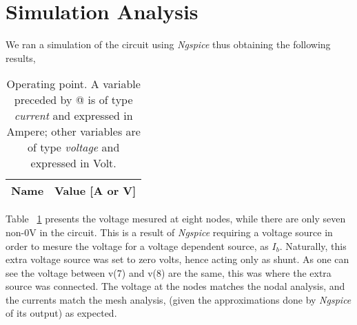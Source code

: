 \section{Simulation Analysis}

\label{sec:simulation}
We ran a simulation of the circuit using {\it Ngspice} thus obtaining the following results, 

\begin{table}[h]
\scriptsize
  \centering
  \begin{tabular}{|l|r|}
    \hline    
    {\bf Name} & {\bf Value [A or V]} \\ \hline
    
  \end{tabular}
  \caption{\scriptsize Operating point. A variable preceded by @ is of type {\em current}
    and expressed in Ampere; other variables are of type {\it voltage} and expressed in
    Volt.}
  \label{tab:op}
\end{table}
Table ~\ref{tab:op} presents the voltage mesured at eight nodes, while there are only seven non-0V in the circuit. This is a result of {\it Ngspice} requiring a voltage source in order to mesure the voltage for a voltage dependent source, as $I_b$. Naturally, this extra voltage source was set to zero volts, hence acting only as shunt. As one can see the voltage between v(7) and v(8) are the same, this was where the extra source was connected. 
The voltage at the nodes matches the nodal analysis, and the currents match the mesh analysis, (given the approximations done by {\it Ngspice} of its output) as expected. 





